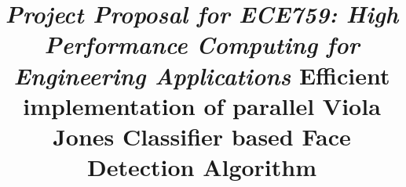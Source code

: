 \title{
\vspace{-0.15in}
\emph{\hspace{0.5in} Project Proposal for ECE759: High Performance Computing for Engineering Applications}\newline
\newline
Efficient implementation of parallel Viola Jones Classifier based Face Detection Algorithm  
\vspace{-0.15in}
}

